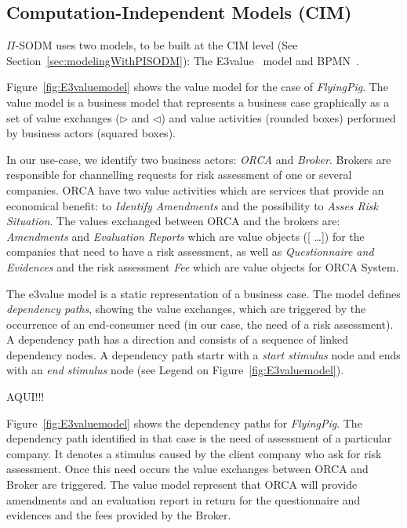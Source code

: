 \subsection{Computation-Independent Models (CIM)}

$\Pi$-SODM uses two models, to be built at the CIM level (See Section~\ref{sec:modelingWithPISODM}): The E3value~\cite{e3value} model and BPMN~\cite{BPMN}.

Figure~\ref{fig:E3valuemodel} shows the value model for the case of \textsl{FlyingPig}.
The value model is a business model that represents a business case graphically as a set of value exchanges ($\triangleright$ and $\triangleleft$) and value activities (rounded boxes) performed by business actors (squared boxes).

In our use-case, we identify two business actors: \textsl{ORCA} and \textsl{Broker}. 
Brokers are responsible for channelling requests for risk assessment of one or several companies. 
ORCA have two value activities which are services that provide an economical benefit: to \textsl{Identify Amendments} and the possibility to \textsl{Asses Risk Situation}. 
The values exchanged between ORCA and the brokers are: \textsl{Amendments} and \textsl{Evaluation Reports} which are value objects ([ \!\dots]) for the companies that need to have a risk assessment, as well as  \textsl{Questionnaire and Evidences} and the risk assessment \textsl{Fee} which are value objects for ORCA System.

The e3value model is a static representation of a business case.
The model defines \textit{dependency paths}, showing the value exchanges, which are triggered by the occurrence of an end-consumer need (in our case, the need of a risk assessment). 
A dependency path has a direction and consists of a sequence of linked dependency nodes.
A dependency path startr with a \textit{start stimulus} node and ends with an \textit{end stimulus} node (see Legend on Figure~\ref{fig:E3valuemodel}). 

AQUI!!!

Figure~\ref{fig:E3valuemodel} shows the dependency paths for \textsl{FlyingPig}. The dependency path identified in that case is the need of assessment of a particular company. It denotes a stimulus caused by the client company who ask for risk assessment. Once this need occurs the value exchanges between ORCA and Broker are triggered. The value model represent that ORCA will provide amendments and an evaluation report in return for the questionnaire and evidences and the fees provided by the Broker. 

